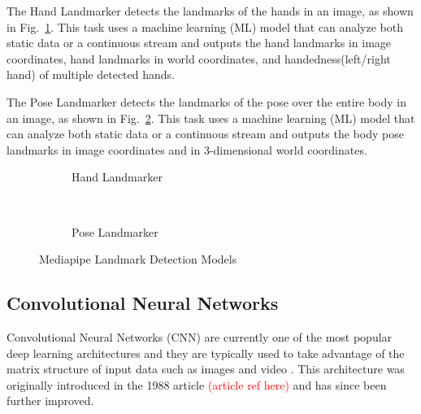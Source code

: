 The Hand Landmarker detects the landmarks of the hands in an image, as shown in Fig.~\ref{fig:mediapipe_hand_landmarks}. This task uses a machine learning (ML) model that can analyze both static data or a continuous stream and outputs the hand landmarks in image coordinates, hand landmarks in world coordinates, and handedness(left/right hand) of multiple detected hands.

The Pose Landmarker detects the landmarks of the pose over the entire body in an image, as shown in Fig.~\ref{fig:mediapipe_pose_landmarks}.  This task uses a machine learning (ML) model that can analyze both static data or a continuous stream and outputs the body pose landmarks in image coordinates and in 3-dimensional world coordinates.
\fi

\begin{figure}[!ht]
    \centering
    \begin{subfigure}[b]{0.49\textwidth}
        \caption[Hand Landmarker]{Hand Landmarker}
        \label{fig:mediapipe_hand_landmarks}
    \end{subfigure} \
    \begin{subfigure}[b]{0.49\textwidth}
        \caption[Pose Landmarker]{Pose Landmarker}
        \label{fig:mediapipe_pose_landmarks}
    \end{subfigure}
    \caption[Mediapipe Landmark Detection Models]{Mediapipe Landmark Detection Models}
    \label{fig:mediapipe_landmarks}
\end{figure}


\subsection{Convolutional Neural Networks}

Convolutional Neural Networks (CNN) are currently one of the most popular deep learning architectures and they are typically used to take advantage of the matrix structure of input data such as images and video \cite{Sarker2021}.  This architecture was originally introduced in the 1988 article \textcolor{red}{(article ref here)} and has since been further improved.

